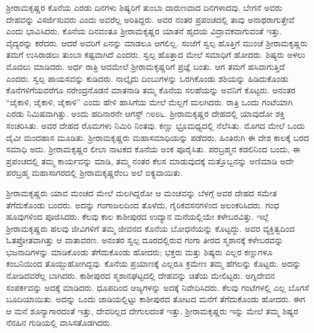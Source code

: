 ಶ‍್ರೀರಾಮಕೃಷ್ಣರ ಕೊನೆಯ ಎರಡು ದಿನಗಳು ಶಿಷ್ಯರಿಗೆ ತುಂಬಾ ದಾರುಣವಾದ ದಿನಗಳಾದವು. ಬೇಗನೆ ಅವರು ದೇಹವನ್ನು ವಿಸರ್ಜಿಸುವರು ಎಂದು ಅವರೆಲ್ಲ ಅರಿತಿದ್ದರು. ಅವರ ನಂತರ ಪ್ರಪಂಚದಲ್ಲಿ ತಾವು ಅನಾಥರಾಗುತ್ತೇವೆ ಎಂದು ಭಾವಿಸಿದರು. ಕೊನೆಯ ದಿನವಂತೂ ಶ‍್ರೀರಾಮಕೃಷ್ಣರ ಯಾತನೆ ಹೃದಯ ವಿದ್ರಾವಕವಾಗುವಂತೆ ಇತ್ತು. ವೈದ್ಯರನ್ನು ಕರೆದರು. ಆದರೆ ಅವರಿಗೆ ಏನನ್ನು ಮಾಡಲೂ ಆಗಲಿಲ್ಲ. ಸಂಜೆಗೆ ಸ್ವಲ್ಪ ಹೊತ್ತಿಗೆ ಮುಂಚೆ ಶ‍್ರೀರಾಮಕೃಷ್ಣರು ತಮಗೆ ಉಸಿರಾಡಲು ತುಂಬಾ ಕಷ್ಟವಾಗಿದೆ ಎಂದರು. ಸ್ವಲ್ಪ ಹೊತ್ತಾದ ಮೇಲೆ ಸಮಾಧಿಗೆ ಹೋದರು. ಶಿಷ್ಯರು ಅಳಲು ಮೊದಲು ಮಾಡಿದರು. ಅರ್ಧ ರಾತ್ರಿ ಆದಮೇಲೆ ಶ‍್ರೀರಾಮಕೃಷ್ಣರಿಗೆ ಪ್ರಜ್ಞೆ ಬಂತು. ಆಗ ತಮಗೆ ಹಸಿವಾಗುತ್ತಿದೆ ಎಂದರು. ಸ್ವಲ್ಪ ಪಾಯಸವನ್ನು ಕುಡಿದರು. ನಾಲ್ಕೈದು ದಿಂಬುಗಳನ್ನು ಒರಗಿಕೊಂಡು ಶಶಿಯನ್ನು ಹಿಡಿದುಕೊಂಡು ಕೊನೆಗಳಿಗೆಯವರೆಗೂ ನರೇಂದ್ರನೊಡನೆ ಮಾತನಾಡಿ ತಮ್ಮ ಕೊನೆಯ ಸಲಹೆಯನ್ನು ಅವನಿಗೆ ಕೊಟ್ಟರು. ಅನಂತರ “ಜೈಕಾಳಿ, ಜೈಕಾಳಿ, ಜೈಕಾಳಿ” ಎಂದು ಹೇಳಿ ಹಾಸಿಗೆಯ ಮೇಲೆ ಮೆಲ್ಲಗೆ ಮಲಗಿದರು. ರಾತ್ರಿ ಒಂದು ಗಂಟೆಯಾಗಿ ಎರಡು ನಿಮಿಷವಾಗಿತ್ತು. ಅಂದು ಹದಿನಾರನೇ ಆಗಸ್ಟ್ ೧೮೮೬. ಶ‍್ರೀರಾಮಕೃಷ್ಣರ ದೇಹದಲ್ಲಿ ಯಾವುದೋ ಶಕ್ತಿ ಸಂಚರಿಸಿತು. ಅವರ ದೇಹದ ರೊಮಗಳು ನಿಮಿರಿ ನಿಂತವು. ಕಣ್ಣು ಭ್ರೂಮಧ್ಯದಲ್ಲಿ ನೆಲೆಸಿತು. ಮೊಗದ ಮೇಲೆ ಒಂದು ದೈವೀ ಮಂದಹಾಸ ಮೂಡಿತು. ಶ‍್ರೀರಾಮಕೃಷ್ಣರು ಮಹಾಸಮಾಧಿಯನ್ನು ಪಡೆದರು. ಹಿಂತಿರುಗಿ ಈ ದೇಶ ಕಾಲಕ್ಕೆ ಬರದ ಸಮಾಧಿ ಅದು. ಶ‍್ರೀರಾಮಕೃಷ್ಣರ ಲೀಲಾ ನಾಟಕದ ಕೊನೆಯ ಅಂಕ ಪೂರೈಸಿತು. ಪರಬ್ರಹ್ಮನ ಕಡಲಿನಿಂದ ಬಂದು, ಈ ಪ್ರಪಂಚದಲ್ಲಿ ತಮ್ಮ ಕಾರ್ಯವನ್ನು ಮಾಡಿ, ತಮ್ಮ ನಂತರ ಕೆಲಸ ಮಾಡುವುದಕ್ಕೆ ಮತ್ತೊಬ್ಬನನ್ನು ಅಣಿಮಾಡಿ ಅದೇ ಪರಬ್ರಹ್ಮ ಮಹಾಸಾಗರದಲ್ಲಿ ಶ‍್ರೀರಾಮಕೃಷ್ಣರೆಂಬ ಅಲೆ ಐಕ್ಯವಾಯಿತು.

ಶ‍್ರೀರಾಮಕೃಷ್ಣರು ಯಾವ ಮಂಚದ ಮೇಲೆ ಮಲಗಿದ್ದರೋ ಆ ಮಂಚವನ್ನು ಬೆಳಗ್ಗೆ ಅವರ ದೇಹದ ಸಮೇತ ತೆಗೆದುಕೊಂಡು ಬಂದರು. ಅದನ್ನು ಗಂಗಾಜಲದಿಂದ ತೊಳೆದು, ಗೈರಿಕವಸನಗಳಿಂದ ಅಲಂಕರಿಸಿದರು. ಗಂಧ ಹೂವುಗಳಿಂದ ಪೂಜಿಸಿದರು. ಕೆಲವು ಕಾಲ ಕಾಶೀಪುರದ ಉದ್ಯಾನ ಮನೆಯಲ್ಲಿಯೇ ಕಳೇಬರವಿತ್ತು. ಇಲ್ಲೆ ಶ‍್ರೀರಾಮಕೃಷ್ಣರು ಹಲವು ಜೀವಿಗಳಿಗೆ ತಮ್ಮ ಜೀವನದ ಕೊನೆಯ ಬೋಧನೆಯನ್ನು ಕೊಟ್ಟದ್ದು. ಅವರ ವ್ಯಕ್ತಿತ್ವದಿಂದ ಓತಪ್ರೋತವಾಗಿತ್ತು ಆ ವಾತಾವರಣ. ಅನಂತರ ಸ್ವಲ್ಪ ದೂರದಲ್ಲಿರುವ ಗಂಗಾ ತೀರದ ಸ್ಮಶಾನಕ್ಕೆ ಕಳೇಬರವನ್ನು ಭಜನಾದಿಗಳನ್ನು ಮಾಡಿಕೊಂಡು ತೆಗೆದುಕೊಂಡು ಹೋದರು; ಭಕ್ತರು ಮತ್ತು ಶಿಷ್ಯರು ಎಲ್ಲರ ಕಣ್ಣುಗಳೂ ಕಂಬನಿಯಿಂದ ತೊಯ್ದುಹೋಗಿದ್ದವು. ಕೊನೆಯ ಪ್ರಯಾಣಕ್ಕೆ ಎಲ್ಲರೂ ಕ್ರಮೇಣ ತಮ್ಮ ಹೆಗಲನ್ನು ಕೊಟ್ಟರು. ಅದನ್ನು ನೋಡಿದವರೆಲ್ಲ ಬಾಗಿದರು. ಕಾಶೀಪುರದ ಸ್ಮಶಾನಘಟ್ಟದಲ್ಲಿ ದೇಹವನ್ನು ಚಿತೆಯ ಮೇಲಿಟ್ಟರು. ಅಗ್ನಿದೇವನ ಸಂಪರ್ಕವನ್ನು ಅದಕ್ಕೆ ಮಾಡಿದರು. ಧೂಪದಿಂದ ಆಜ್ಯಗಳನ್ನು ಅದಕ್ಕೆ ನಿವೇದಿಸಿದರು. ಕೆಲವು ಗಂಟೆಗಳಲ್ಲಿ ಎಲ್ಲ ಬೊಗಸೆ ಬೂದಿಯಾಯಿತು. ಅದನ್ನು ಒಂದು ಜಾಡಿಯಲ್ಲಿಟ್ಟು ಕಾಶೀಪುರದ ತೋಟದ ಮನೆಗೆ ತೆಗೆದುಕೊಂಡು ಹೋದರು. ಈಗ ಆ ಮನೆ ಶೂನ್ಯಾಗಾರದಂತೆ ಇತ್ತು, ದೇವರಿಲ್ಲದ ದೇಗುಲದಂತೆ ಇತ್ತು. ಶ‍್ರೀರಾಮಕೃಷ್ಣರು ಇನ್ನು ಮೇಲೆ ತಮ್ಮ ಶಿಷ್ಯರ ನೆನಹಿನ ಗುಡಿಯಲ್ಲಿ ವಾಸಿಸತೊಡಗಿದರು.


